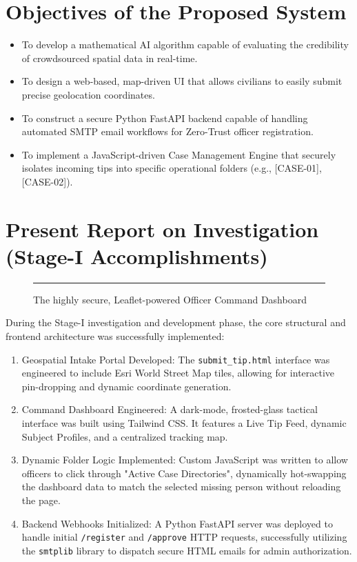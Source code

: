 \documentclass[12pt,a4paper]{report}
\begin{document}
\section{Objectives of the Proposed System}
\begin{itemize}
    \item To develop a mathematical AI algorithm capable of evaluating the credibility of crowdsourced spatial data in real-time.
    \item To design a web-based, map-driven UI that allows civilians to easily submit precise geolocation coordinates.
    \item To construct a secure Python FastAPI backend capable of handling automated SMTP email workflows for Zero-Trust officer registration.
    \item To implement a JavaScript-driven Case Management Engine that securely isolates incoming tips into specific operational folders (e.g., [CASE-01], [CASE-02]).
\end{itemize}

\section{Present Report on Investigation (Stage-I Accomplishments)}

\begin{figure}[H]
    \centering
    \rule{10cm}{6cm} %
    \caption{The highly secure, Leaflet-powered Officer Command Dashboard}
\end{figure}

During the Stage-I investigation and development phase, the core structural and frontend architecture was successfully implemented:
\begin{enumerate}
    \item Geospatial Intake Portal Developed: The \texttt{submit\_tip.html} interface was engineered to include Esri World Street Map tiles, allowing for interactive pin-dropping and dynamic coordinate generation.
    \item Command Dashboard Engineered: A dark-mode, frosted-glass tactical interface was built using Tailwind CSS. It features a Live Tip Feed, dynamic Subject Profiles, and a centralized tracking map.
    \item Dynamic Folder Logic Implemented: Custom JavaScript was written to allow officers to click through "Active Case Directories", dynamically hot-swapping the dashboard data to match the selected missing person without reloading the page.
    \item Backend Webhooks Initialized: A Python FastAPI server was deployed to handle initial \texttt{/register} and \texttt{/approve} HTTP requests, successfully utilizing the \texttt{smtplib} library to dispatch secure HTML emails for admin authorization.
\end{enumerate}
\end{document}
